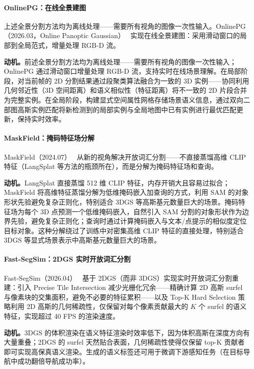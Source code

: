 \paragraph{OnlinePG：在线全景建图} 上述全景分割方法均为离线处理——需要所有视角的图像一次性输入。OnlinePG（2026.03，Online Panoptic Gaussian）~\cite{2603_18510} 实现在线全景建图：采用滑动窗口的局部到全局范式，增量处理 RGB-D 流。

\textbf{动机。}前述全景分割方法均为离线处理——需要所有视角的图像一次性输入；OnlinePG 通过滑动窗口增量处理 RGB-D 流，支持实时在线场景理解。在局部阶段，对当前帧的 2D 分割结果通过段聚类算法融合为一致的 3D 实例——协同利用几何邻近性（3D 空间距离）和语义相似性（特征距离）将不一致的 2D 片段合并为完整实例。在全局阶段，构建显式空间属性网格存储场景语义信息，通过双向二部图高斯实例匹配将新检测到的局部实例与全局地图中已有实例进行最优匹配更新，保持实时效率。

\paragraph{MaskField：掩码特征场分解} MaskField（2024.07）~\cite{2407_01220} 从新的视角解决开放词汇分割——不直接蒸馏高维 CLIP 特征（LangSplat 等方法的瓶颈所在），而是分解为掩码特征场和查询。

\textbf{动机。}LangSplat 直接蒸馏 512 维 CLIP 特征，内存开销大且容易过拟合；MaskField 将高维特征蒸馏分解为低维掩码嵌入加查询的方式，利用 SAM 的对象形状先验避免复杂正则化，特别适合 3DGS 等高斯基元数量巨大的场景。掩码特征场为每个 3D 点预测一个低维掩码嵌入，自然引入 SAM 分割的对象形状作为边界先验，避免复杂正则化；查询时通过计算掩码嵌入与文本/点提示的相似度定位目标对象。这种分解绕过了训练中对密集高维 CLIP 特征的直接处理，特别适合 3DGS 等显式场景表示中高斯基元数量巨大的场景。

\paragraph{Fast-SegSim：2DGS 实时开放词汇分割} Fast-SegSim（2026.04）~\cite{2604_10951} 基于 2DGS（而非 3DGS）实现实时开放词汇分割重建：引入 Precise Tile Intersection 减少光栅化冗余——精确计算 2D 高斯 surfel 与像素块的交集面积，避免不必要的特征累积——以及 Top-K Hard Selection 策略利用 2D 高斯的几何稀疏性，仅保留对每个像素贡献最大的 $K$ 个 surfel 的语义特征，实现超过 40 FPS 的渲染速度。

\textbf{动机。}3DGS 的体积渲染在语义特征渲染时效率低下，因为体积高斯在深度方向有大量重叠；2DGS 的 surfel 天然贴合表面，几何稀疏性使得仅保留 top-K 贡献者即可实现高保真语义渲染。生成的语义标签还可用于微调下游感知任务（在目标导航中成功翻倍导航成功率）。

